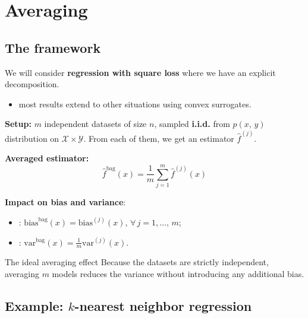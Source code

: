 \documentclass[
11pt,notheorems,hyperref={pdfauthor=whatever}
]{beamer}
\begin{document}
\justifying
\section{Averaging}
\subsection{The framework}
\begin{frame}
    We will consider \alert{\textbf{regression with square loss}} where we have an explicit  decomposition.
    \begin{itemize}
        \item most results extend to other situations using convex surrogates.
    \end{itemize}

    \textbf{Setup:} \(m\) independent datasets of size \(n\), sampled \alert{\textbf{i.i.d.}} from \(p(x,\,y)\) distribution on \(\mathcal{X}\times\mathcal{Y}\). From each of them, we get an estimator \(\hat{f}^{(j)}\).

    \vspace{0.5em}
    \textbf{Averaged estimator:}
    \[
        \hat{f}^{\text{bag}}(x) = \frac{1}{m} \sum_{j=1}^m \hat{f}^{(j)}(x)
    \]

    \vspace{0.5em}
    \textbf{Impact on bias and variance}:
    \begin{itemize}
        \item {}: \(\text{bias}^{\text{bag}}(x) = \text{bias}^{(j)}(x)\), \(\forall\,j=1,\dots,\,m\);
        
        \item {}: \(\text{var}^{\text{bag}}(x) = \frac{1}{m}\text{var}^{(j)}(x)\).
    \end{itemize}

    \vspace{0.5em}
    \begin{block}{The ideal averaging effect}
        Because the datasets are strictly independent, averaging \(m\) models reduces the variance without introducing any additional bias.
    \end{block}
\end{frame}


\subsection{Example: \(k\)-nearest neighbor regression}
\end{document}
